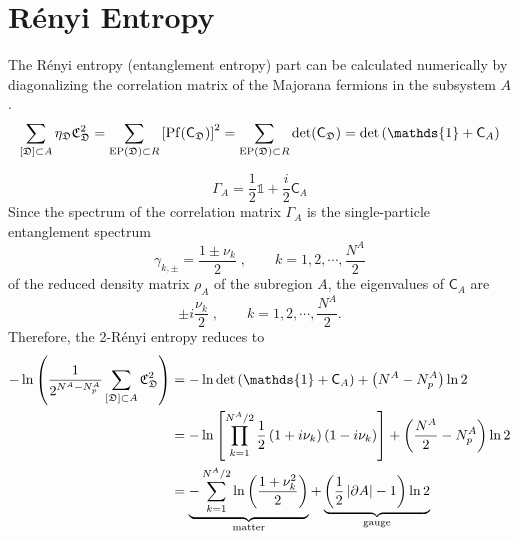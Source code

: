 \section{R\'enyi Entropy}
The R\'enyi entropy (entanglement entropy) part can be calculated numerically by diagonalizing the correlation matrix of the Majorana fermions in the subsystem $A$.
\[
    \sum_{[\mathfrak{D}]\subset A} \eta_\mathfrak{D} \mathfrak{C}_\mathfrak{D}^2
    =
    \sum_{\mrm{EP}(\mathfrak{D}) \subset R} \lrm{\mrm{Pf}(\mathsf{C}_\mathfrak{D})}^2 
    =
    \sum_{\mrm{EP}(\mathfrak{D}) \subset R} \det(\mathsf{C}_\mathfrak{D})
    = 
    \det\lr{\mathds{1} + \mathsf{C}_A}
\]

\[
\Gamma_A = \frac{1}{2}\mathds{1} + \frac{i}{2} \mathsf{C}_A
\]
Since the spectrum of the correlation matrix $\Gamma_A$ is the single-particle entanglement spectrum 
\[
\gamma_{k,\pm} = \frac{1 \pm \nu_{k}}{2} \;, \qquad k = 1,2,\cdots, \frac{N^A}{2}
\]
of the reduced density matrix $\rho_A$ of the subregion $A$, the eigenvalues of $\mathsf{C}_A$ are 
\begin{equation}\label{eq:CA-eigen}
    \pm i\frac{\nu_k}{2} \;,\qquad k = 1,2,\cdots, \frac{N^A}{2}.
\end{equation}
Therefore, the 2-R\'enyi entropy reduces to
\begin{align*}
    -\ln\lr{ \frac{1}{2^{N^A-N^A_p}} \sum_{[\mathfrak{D}]\subset A} \mathfrak{C}_\mathfrak{D}^2}
    &=
    -\ln\det\lr{\mathds{1} + \mathsf{C}_A} + \lr{N^A - N^A_p}\ln 2 \\
    &=
    -\ln\lrm{\prod_{k = 1}^{N^A/2} \frac{1}{2}\lr{1 + i\nu_k}\lr{1 - i\nu_k} } + \lr{\frac{N^A}{2} - N^A_p}\ln 2 \\
    &= 
    \underbrace{
    -\sum_{k=1}^{N^A/2}\ln\lr{\frac{1 + \nu_k^2}{2}} 
    }_{\text{matter}}
    + 
    \underbrace{
    \lr{\frac{1}{2}\abs{\de A} - 1}\ln 2 
    }_{\text{gauge}}
\end{align*}